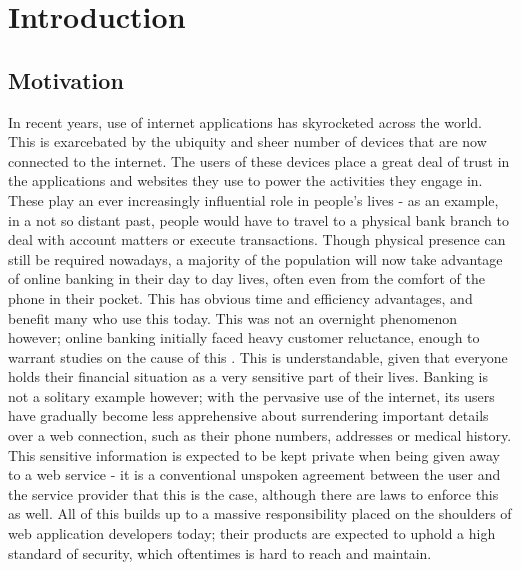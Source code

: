 \chapter{Introduction} 

\section{Motivation}

In recent years, use of internet applications has skyrocketed across the world. This is exarcebated by the ubiquity and sheer number of devices that are now connected to the internet. 
The users of these devices place a great deal of trust in the applications and websites they use to power the activities they engage in. 
These play an ever increasingly influential role in people's lives - as an example, in a not so distant past, people would have to travel to a physical bank branch to deal with account matters or execute transactions. Though physical presence can still be required nowadays, a majority of the population will now take advantage of online banking in their day to day lives, often even from the comfort of the phone in their pocket. This has obvious time and efficiency advantages, and benefit many who use this today.
This was not an overnight phenomenon however; online banking initially faced heavy customer reluctance, enough to warrant studies on the cause of this \cite{KUISMA200775}. 
This is understandable, given that everyone holds their financial situation as a very sensitive part of their lives.
Banking is not a solitary example however; with the pervasive use of the internet, its users have gradually become less apprehensive about surrendering important details over a web connection, such as their phone numbers, addresses or medical history.  
This sensitive information is expected to be kept private when being given away to a web service - it is a conventional unspoken agreement between the user and the service provider that this is the case, although there are laws to enforce this as well.
All of this builds up to a massive responsibility placed on the shoulders of web application developers today; their products are expected to uphold a high standard of security, which oftentimes is hard to reach and maintain. \\

